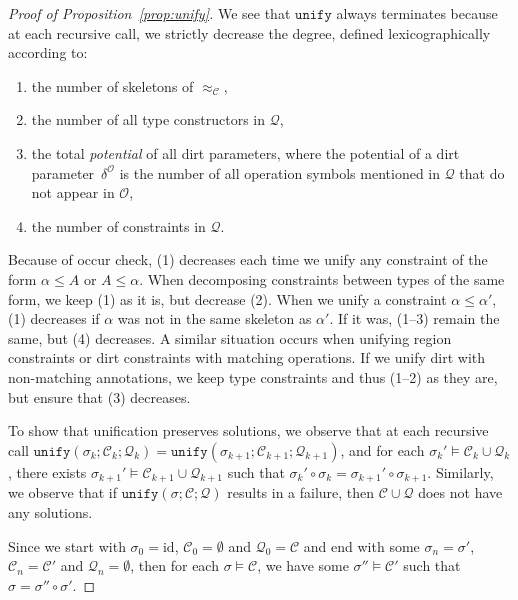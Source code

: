 \documentclass{LMCS}
\newcommand{\drt}{\delta}
\newcommand{\kord}[1]{\mathtt{#1}}
\renewcommand{\le}{\leqslant}
\newcommand{\cstr}{\mathcal{C}}
\newcommand{\queue}{\mathcal{Q}}
\newcommand{\ops}{\mathcal{O}}
\newcommand{\sol}{\sigma}
\newcommand{\unify}{\kord{unify}}
\begin{document}
\begin{proof}[Proof of Proposition~\ref{prop:unify}]

We see that $\unify$ always terminates because at each recursive call,
we strictly decrease the degree, defined lexicographically according to:
\begin{enumerate}
\item
  the number of skeletons of $\approx_\cstr$,
\item
  the number of all type constructors in $\queue$,
\item
  the total \emph{potential} of all dirt parameters,
  where the potential of a dirt parameter~$\drt^\ops$ is the number
  of all operation symbols mentioned in $\queue$ that do not appear in $\ops$,
\item
  the number of constraints in $\queue$.
\end{enumerate}
Because of occur check, (1) decreases each time we unify any constraint of the form $\alpha \le A$ or $A \le \alpha$.
When decomposing constraints between types of the same form, we keep (1) as it is, but decrease (2).
When we unify a constraint $\alpha \le \alpha'$, (1) decreases if $\alpha$ was not in the same skeleton as $\alpha'$.
If it was, (1--3) remain the same, but (4) decreases.
A similar situation occurs when unifying region constraints or dirt constraints with matching operations.
If we unify dirt with non-matching annotations, we keep type constraints and thus (1--2) as they are,
but ensure that (3) decreases.

To show that unification preserves solutions, we observe that at each recursive call
$\unify(\sol_k; \cstr_k; \queue_k) = \unify(\sol_{k + 1}; \cstr_{k + 1}; \queue_{k + 1})$,
and for each $\sol_k' \models \cstr_k \cup \queue_k$,
there exists $\sol_{k + 1}' \models \cstr_{k + 1} \cup \queue_{k + 1}$
such that $\sol_k' \circ \sol_k = \sol_{k + 1}' \circ \sol_{k + 1}$.
Similarly, we observe that if $\unify(\sol; \cstr; \queue)$ results in a failure,
then $\cstr \cup \queue$ does not have any solutions.

Since we start with $\sol_0 = \mathrm{id}$, $\cstr_0 = \emptyset$ and $\queue_0 = \cstr$
and end with some $\sol_n = \sol'$, $\cstr_n = \cstr'$ and $\queue_n = \emptyset$,
then for each $\sol \models \cstr$, we have some $\sol'' \models \cstr'$ such that $\sol = \sol'' \circ \sol'$.
\end{proof}
\end{document}
